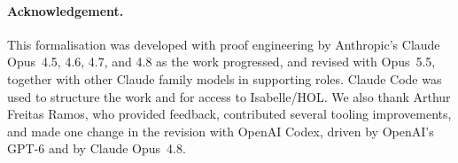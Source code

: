 \paragraph*{Acknowledgement.}
This formalisation was developed with proof engineering by
Anthropic's Claude Opus~4.5, 4.6, 4.7, and 4.8 as the work progressed,
and revised with Opus~5.5, together with other Claude family models in
supporting roles.
Claude Code was used to structure the work and for access to Isabelle/HOL.
We also thank Arthur Freitas Ramos, who provided feedback, contributed
several tooling improvements, and made one change in the revision with
OpenAI Codex, driven by OpenAI's GPT-6 and by Claude Opus~4.8.
